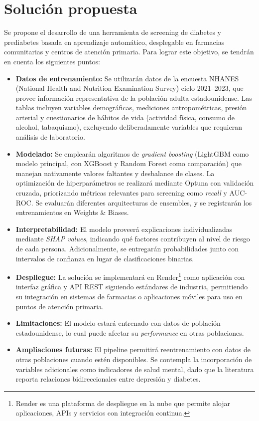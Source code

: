 \documentclass[12pt, a4paper]{report}
\begin{document}
\chapter{Solución propuesta}

Se propone el desarrollo de una herramienta de screening de diabetes y prediabetes basada en aprendizaje automático, desplegable en farmacias comunitarias y centros de atención primaria. Para lograr este objetivo, se tendrán en cuenta los siguientes puntos:

\begin{itemize}
    \item \textbf{Datos de entrenamiento:} Se utilizarán datos de la encuesta NHANES (National Health and Nutrition Examination Survey) ciclo 2021--2023, que provee información representativa de la población adulta estadounidense. Las tablas incluyen variables demográficas, mediciones antropométricas, presión arterial y cuestionarios de hábitos de vida (actividad física, consumo de alcohol, tabaquismo), excluyendo deliberadamente variables que requieran análisis de laboratorio.

    \item \textbf{Modelado:} Se emplearán algoritmos de \textit{gradient boosting} (LightGBM como modelo principal, con XGBoost y Random Forest como comparación) que manejan nativamente valores faltantes y desbalance de clases. La optimización de hiperparámetros se realizará mediante Optuna con validación cruzada, priorizando métricas relevantes para screening como \textit{recall} y AUC-ROC. Se evaluarán diferentes arquitecturas de ensembles, y se registrarán los entrenamientos en Weights \& Biases.

    \item \textbf{Interpretabilidad:} El modelo proveerá explicaciones individualizadas mediante \textit{SHAP values}, indicando qué factores contribuyen al nivel de riesgo de cada persona. Adicionalmente, se entregarán probabilidades junto con intervalos de confianza en lugar de clasificaciones binarias.

    \item \textbf{Despliegue:} La solución se implementará en Render\footnote{Render es una plataforma de despliegue en la nube que permite alojar aplicaciones, APIs y servicios con integración continua.}
    como aplicación con interfaz gráfica y API REST siguiendo estándares de industria, permitiendo su integración en sistemas de farmacias o aplicaciones móviles para uso en puntos de atención primaria.

    \item \textbf{Limitaciones:} El modelo estará entrenado con datos de población estadounidense, lo cual puede afectar su \textit{performance} en otras poblaciones. \\

    \item \textbf{Ampliaciones futuras:} El pipeline permitirá reentrenamiento con datos de otras poblaciones cuando estén disponibles. Se contempla la incorporación de variables adicionales como indicadores de salud mental, dado que la literatura reporta relaciones bidireccionales entre depresión y diabetes.

\end{itemize}
\end{document}
